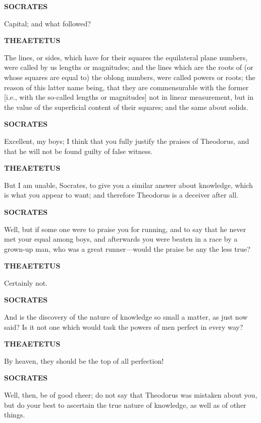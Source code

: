 \documentclass[11pt,letter]{article}
\begin{document}
\par \textbf{SOCRATES}
\par   Capital; and what followed?

\par \textbf{THEAETETUS}
\par   The lines, or sides, which have for their squares the equilateral plane numbers, were called by us lengths or magnitudes; and the lines which are the roots of (or whose squares are equal to) the oblong numbers, were called powers or roots; the reason of this latter name being, that they are commensurable with the former [i.e., with the so-called lengths or magnitudes] not in linear measurement, but in the value of the superficial content of their squares; and the same about solids.

\par \textbf{SOCRATES}
\par   Excellent, my boys; I think that you fully justify the praises of Theodorus, and that he will not be found guilty of false witness.

\par \textbf{THEAETETUS}
\par   But I am unable, Socrates, to give you a similar answer about knowledge, which is what you appear to want; and therefore Theodorus is a deceiver after all.

\par \textbf{SOCRATES}
\par   Well, but if some one were to praise you for running, and to say that he never met your equal among boys, and afterwards you were beaten in a race by a grown-up man, who was a great runner—would the praise be any the less true?

\par \textbf{THEAETETUS}
\par   Certainly not.

\par \textbf{SOCRATES}
\par   And is the discovery of the nature of knowledge so small a matter, as just now said? Is it not one which would task the powers of men perfect in every way?

\par \textbf{THEAETETUS}
\par   By heaven, they should be the top of all perfection!

\par \textbf{SOCRATES}
\par   Well, then, be of good cheer; do not say that Theodorus was mistaken about you, but do your best to ascertain the true nature of knowledge, as well as of other things.
\end{document}
